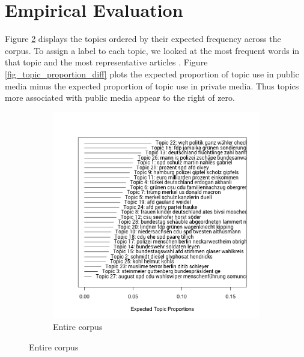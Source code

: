 \documentclass[12pt,a4paper,notitlepage]{article}
\begin{document}
\section{Empirical Evaluation}\label{ch_empirical}

Figure \ref{fig_topic_proportion} displays the topics ordered by their expected frequency across the corpus. To assign a label to each topic, we looked at the most frequent words in that topic and the most representative articles \citep{roberts_model_2016}. Figure \ref{fig_topic_proportion_diff} plots the expected proportion of topic use in public media minus the expected proportion of topic use in private media. Thus topics more associated with public media appear to the right of zero.

\begin{figure}[H]
	\begin{center}
	\caption{Expected topic proportion}
	\begin{subfigure}[normla]{0.4\textwidth}
		\includegraphics[width=\textwidth,keepaspectratio]{../figs/topic_proportion.png}
		\caption{Entire corpus}
		\label{fig_topic_proportion}
	\end{subfigure}
	

\end{center}
\end{figure}
\end{document}
